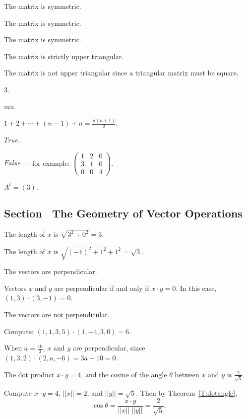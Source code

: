  The matrix is symmetric.

 The matrix is symmetric.

 The matrix is symmetric.

 The matrix is strictly upper triangular.

 The matrix is not upper triangular since a triangular
matrix must be square.

 $3$.

 $mn$.

 $1 + 2 + \cdots + (n-1) + n = \frac{n(n + 1)}{2}$.

 $True$.

 $False$ --- for example:
$\left(\begin{array}{ccc}
1 & 2 & 0 \\
3 & 1 & 0 \\
0 & 0 & 4
\end{array}\right)$.

 \ans $A^t = (3).$



\subsection*{Section~\protect{\ref{S:1.4}} The Geometry of Vector Operations}

 \ans The length of $x$ is $\sqrt{3^2 + 0^2} = 3$.

 \ans The length of $x$ is $\sqrt{(-1)^2 + 1^2 + 1^2} =
\sqrt{3}$.

 \ans The vectors are perpendicular.

\soln Vectors $x$ and $y$ are perpendicular if and only if $x \cdot y = 0$.
In this case, $(1,3) \cdot (3,-1) = 0$.

 \ans The vectors are not perpendicular.

\soln Compute: $(1,1,3,5) \cdot (1,-4,3,0) = 6$.

When $a = \frac{10}{3}$, $x$ and $y$ are perpendicular, since
$(1,3,2) \cdot (2,a,-6) = 3a - 10 = 0$.

\newpage
{} \ans The dot product $x \cdot y = 4$, and the cosine
of the angle $\theta$ between $x$ and $y$ is $\frac{2}{\sqrt{5}}$.

\soln Compute $x \cdot y = 4$, $||x|| = 2$, and $||y|| = \sqrt{5}$.
Then by Theorem~\ref{T:dotangle},
\[
\cos\theta = \frac{x \cdot y}{||x||\;||y||} = \frac{2}{\sqrt{5}}.
\]

